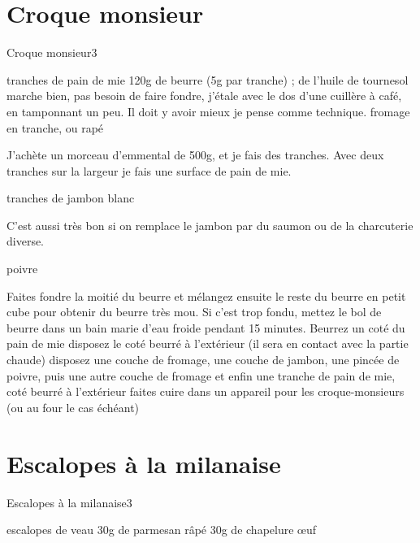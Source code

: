 {\section{Croque monsieur}
\begin{recette}{Croque monsieur}{3}{}{}
\begin{ingredients}
 tranches de pain de mie
\ingredient 120g de beurre (5g par tranche) ; de l'huile de tournesol marche bien, pas besoin de faire fondre, j'étale avec le dos d'une cuillère à café, en tamponnant un peu. Il doit y avoir mieux je pense comme technique.
\ingredient fromage en tranche, ou rapé
\begin{remarque}
J'achète un morceau d'emmental de 500g, et je fais des tranches. Avec deux tranches sur la largeur je fais une surface de pain 
de mie.
\end{remarque}

 tranches de jambon blanc
\begin{remarque}
C'est aussi très bon si on remplace le jambon par du saumon ou de la charcuterie diverse.
\end{remarque}

\ingredient poivre
\end{ingredients}

\begin{preparation}
\etape Faites fondre la moitié du beurre et mélangez ensuite le reste du beurre en petit cube pour obtenir du beurre très mou. Si c'est trop fondu, mettez le bol de beurre dans un bain marie d'eau froide pendant 15 minutes.
\etape Beurrez un coté du pain de mie
\etape disposez le coté beurré à l'extérieur (il sera en contact avec la partie chaude)
\etape disposez une couche de fromage, une couche de jambon, une pincée de poivre, puis une autre couche de fromage et enfin une 
tranche de pain de mie, coté beurré à l'extérieur
\etape faites cuire dans un appareil pour les croque-monsieurs (ou au four le cas échéant)
\end{preparation}
\end{recette}

\section{Escalopes à la milanaise}
\begin{recette}{Escalopes à la milanaise}{3}{}{}
\begin{ingredients}
 escalopes de veau
\ingredient 30g de parmesan râpé
\ingredient 30g de chapelure
 œuf
\end{ingredients}


\end{recette}}
